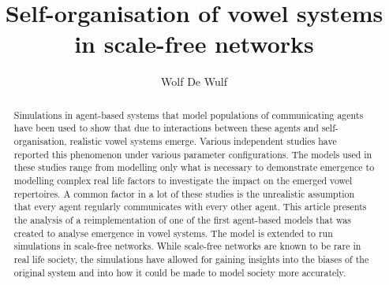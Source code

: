 \documentclass[11pt]{article}
\title{\vspace{-0.8cm}Self-organisation of vowel systems in scale-free networks}
\author{Wolf De Wulf}
\date{}
\begin{document}
\maketitle

\begin{abstract}
    Simulations in agent-based systems that model populations of communicating agents have been used to show that due
    to
    interactions between these agents and self-organisation, realistic vowel systems emerge. Various independent
    studies
    have reported this phenomenon under various parameter configurations. The models used in these studies range from
    modelling only what is necessary to demonstrate emergence to modelling complex real life factors to investigate the
    impact on the emerged vowel repertoires. A common factor in a lot of these studies is the unrealistic assumption
    that
    every agent regularly communicates with every other agent. This article presents the analysis of a reimplementation
    of
    one of the first agent-based models that was created to analyse emergence in vowel systems. The model is extended
    to
    run simulations in scale-free networks. While scale-free networks are known to be rare in real life society, the
    simulations have allowed for gaining insights into the biases of the original system and into how it
    could be made to model society more accurately.
\end{abstract}
\end{document}
